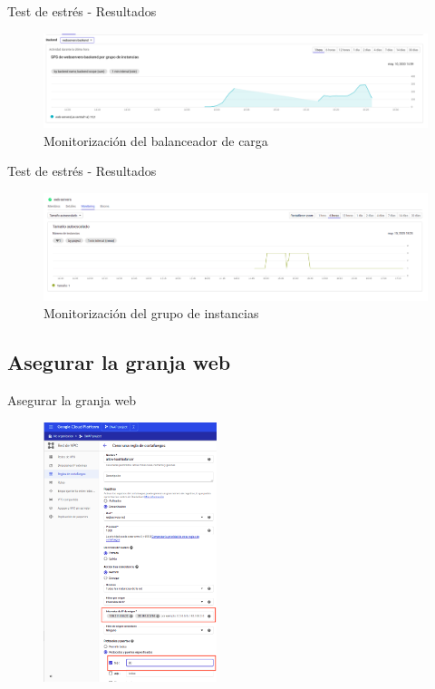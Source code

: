 \documentclass{beamer}
\begin{document}
\begin{frame}[fragile]{Test de estrés - Resultados}
  \begin{figure}[H]
	    \centering
			\includegraphics[width=\textwidth]{project/monitoring.png}
			\caption{Monitorización del balanceador de carga}
	\end{figure}
\end{frame}
\begin{frame}[fragile]{Test de estrés - Resultados}
  \begin{figure}[H]
	    \centering
			\includegraphics[width=\textwidth]{project/monitoring_groups.png}
			\caption{Monitorización del grupo de instancias}
	\end{figure}
\end{frame}

\subsection{Asegurar la granja web}

\begin{frame}[fragile]{Asegurar la granja web}
  \begin{figure}[H]
		\centering
		\includegraphics[width=0.45\textwidth]{project/firewall_balancer.png}
	\end{figure}
\end{frame}
\end{document}
